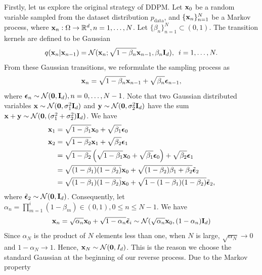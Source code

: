 Firstly, let us explore the original strategy of DDPM. Let $\mathbf{x}_0$ be a random variable sampled from the dataset distribution $p_{\text{data}}$, and $\{\mathbf{x}_n\}_{n=1}^N$ be a Markov process, where $\mathbf{x}_n:\Omega\to\mathbb{R}^d, n=1,\ldots,N$. Let $\{\beta_n\}_{n=1}^N\subset(0,1)$. The transition kernels are defined to be Gaussian
\begin{equation}
 q(\mathbf{x}_n|\mathbf{x}_{n-1})=\mathcal{N}(\mathbf{x}_n;\sqrt{1-\beta_n}\mathbf{x}_{n-1},\beta_n \mathbf{I}_d),\,\,\, i =1,\ldots,N.
\end{equation}
From these Gaussian transitions, we reformulate the sampling process as
\begin{equation}
 \label{equation:trans}
 \mathbf{x}_n = \sqrt{1-\beta_n}\mathbf{x}_{n-1}+\sqrt{\beta_n}\bm{\epsilon}_{n-1},
\end{equation}
where $\bm{\epsilon}_{n}\sim\mathcal{N}(\mathbf{0},\mathbf{I}_d), n=0,\ldots,N-1$. Note that two Gaussian distributed variables $\mathbf{x}\sim\mathcal{N}(\mathbf{0},\sigma_1^2\mathbf{I}_d)$ and $\mathbf{y}\sim\mathcal{N}(\mathbf{0},\sigma_2^2\mathbf{I}_d)$ have the sum
$\mathbf{x}+\mathbf{y}\sim \mathcal{N}(\mathbf{0},(\sigma_1^2+\sigma_2^2)\mathbf{I}_d)$. We have
\begin{align*}
 \mathbf{x}_1
  & = \sqrt{1-\beta_1}\mathbf{x}_{0}+\sqrt{\beta_1}\bm{\epsilon}_{0}                                                             \\
 \mathbf{x}_2
  & = \sqrt{1-\beta_2}\mathbf{x}_{1}+\sqrt{\beta_2}\bm{\epsilon}_{1}                                                             \\
  & =\sqrt{1-\beta_2}\left(\sqrt{1-\beta_1}\mathbf{x}_{0}+\sqrt{\beta_1}\bm{\epsilon}_{0}\right)+\sqrt{\beta_2}\bm{\epsilon}_{1} \\
  & =\sqrt{(1-\beta_1)(1-\beta_2)}\mathbf{x}_{0}+\sqrt{(1-\beta_2)\beta_1+\beta_2}\Tilde{\bm{\epsilon}}_{2}                      \\
  & =\sqrt{(1-\beta_1)(1-\beta_2)}\mathbf{x}_{0}+\sqrt{1-(1-\beta_1)(1-\beta_2)}\Tilde{\bm{\epsilon}}_{2},
\end{align*}
where $\Tilde{\bm{\epsilon}}_{2}\sim\mathcal{N}(\mathbf{0},\mathbf{I}_d)$. Consequently, let $\alpha_n=\prod\limits_{m=1}^i(1-\beta_m)\in (0,1), 0\le n \le N-1$. We have
\begin{equation}
 \mathbf{x}_n = \sqrt{\alpha_n}\mathbf{x}_0 + \sqrt{1- \alpha_n}\Tilde{\bm{\epsilon}}_{i}\sim\mathcal{N}(\sqrt{\alpha_n}\mathbf{x}_0, (1- \alpha_n)\mathbf{I}_d)
\end{equation}
Since $\alpha_N$ is the product of $N$ elements less than one, when $N$ is large, $\sqrt{\alpha_N}\to 0$ and $1-\alpha_N\to 1$. Hence, $\mathbf{x}_N\sim \mathcal{N}(\mathbf{0},I_d)$. This is the reason we choose the standard Gaussian at the beginning of our reverse process. Due to the Markov property
